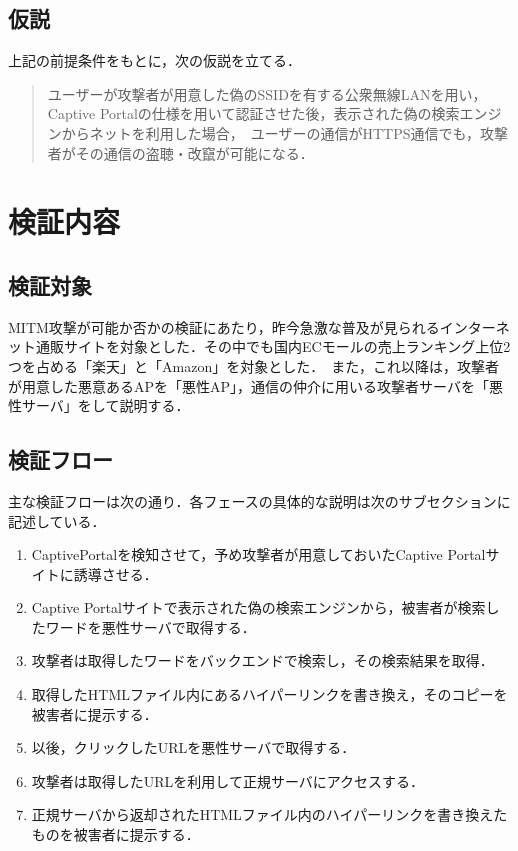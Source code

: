 \documentclass[dvipdfmx]{jsarticle}
\begin{document}
        \subsection{仮説}
            上記の前提条件をもとに，次の仮説を立てる．
            \begin{quote}
                ユーザーが攻撃者が用意した偽のSSIDを有する公衆無線LANを用い，Captive Portalの仕様を用いて認証させた後，表示された偽の検索エンジンからネットを利用した場合，\
                ユーザーの通信がHTTPS通信でも，攻撃者がその通信の盗聴・改竄が可能になる．
            \end{quote}
    \section{検証内容}
        \subsection{検証対象}
            MITM攻撃が可能か否かの検証にあたり，昨今急激な普及が見られるインターネット通販サイトを対象とした．その中でも国内ECモールの売上ランキング上位2つを占める「楽天」と「Amazon」を対象とした．\
            また，これ以降は，攻撃者が用意した悪意あるAPを「悪性AP」，通信の仲介に用いる攻撃者サーバを「悪性サーバ」をして説明する．
        \subsection{検証フロー}
            主な検証フローは次の通り．各フェースの具体的な説明は次のサブセクションに記述している．
            \begin{enumerate}
                \item CaptivePortalを検知させて，予め攻撃者が用意しておいたCaptive Portalサイトに誘導させる．
                \item Captive Portalサイトで表示された偽の検索エンジンから，被害者が検索したワードを悪性サーバで取得する．
                \item 攻撃者は取得したワードをバックエンドで検索し，その検索結果を取得．
                \item 取得したHTMLファイル内にあるハイパーリンクを書き換え，そのコピーを被害者に提示する．
                \item 以後，クリックしたURLを悪性サーバで取得する．
                \item 攻撃者は取得したURLを利用して正規サーバにアクセスする．
                \item 正規サーバから返却されたHTMLファイル内のハイパーリンクを書き換えたものを被害者に提示する．
            \end{enumerate}
\end{document}
